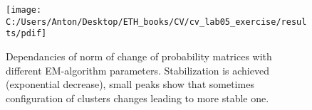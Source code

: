 \documentclass{report}
\begin{document}
\begin{figure}[h!]
	\begin{center}
		\begin{minipage}[h]{0.6\linewidth}
			\texttt{[image: C:/Users/Anton/Desktop/ETH\_books/CV/cv\_lab05\_exercise/results/pdif]}
		\end{minipage}
	\caption{Dependancies of norm of change of probability matrices with different EM-algorithm parameters. Stabilization is achieved (exponential decrease), small peaks show that sometimes configuration of clusters changes leading to more stable one.}
	\end{center}
\end{figure}

\fi
\end{document}
